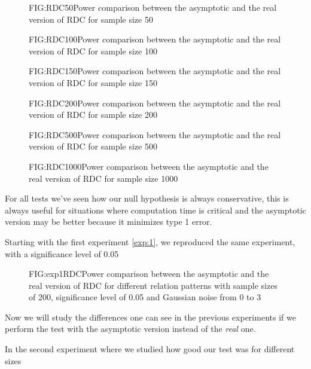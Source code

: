 \begin{figure}[RDC asymptotic size 50]{FIG:RDC50}{Power comparison between the asymptotic and the real version of RDC for sample size 50}
\end{figure}
\begin{figure}[RDC asymptotic size 100]{FIG:RDC100}{Power comparison between the asymptotic and the real version of RDC for sample size 100}
\end{figure}
\begin{figure}[RDC asymptotic size 150]{FIG:RDC150}{Power comparison between the asymptotic and the real version of RDC for sample size 150}
\end{figure}
\begin{figure}[RDC asymptotic size 200]{FIG:RDC200}{Power comparison between the asymptotic and the real version of RDC for sample size 200}
\end{figure}
\begin{figure}[RDC asymptotic size 500]{FIG:RDC500}{Power comparison between the asymptotic and the real version of RDC for sample size 500}
\end{figure}
\begin{figure}[RDC asymptotic size 1000]{FIG:RDC1000}{Power comparison between the asymptotic and the real version of RDC for sample size 1000}
\end{figure}

For all tests we've seen how our null hypothesis is always conservative, this is always useful for situations where computation time is critical and the asymptotic version may be better because it minimizes type 1 error.

Starting with the first experiment \ref{exp:1}, we reproduced the same experiment, with a significance level of 0.05 

\begin{figure}[Experiment 1 RDC asymptotic vs real]{FIG:exp1RDC}{Power comparison between the asymptotic and the real version of RDC for different relation patterns with sample sizes of 200, significance level of 0.05 and Gaussian noise from 0 to 3}
\end{figure}
Now we will study the differences one can see in the previous experiments if we perform the test with the asymptotic version instead of the \textit{real} one.



In the second experiment where we studied how good our test was for different sizes 




